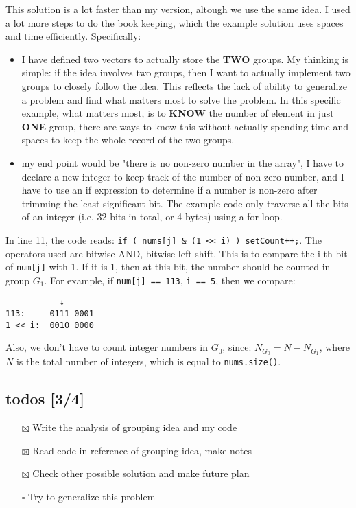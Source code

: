 \documentclass[12pt]{article}
\begin{document}
This solution is a lot faster than my version, altough we use the same idea. I used a lot more steps to do the book keeping, which the example solution uses spaces and time efficiently. Specifically:
\begin{itemize}
\item I have defined two vectors to actually store the \textbf{TWO} groups. My thinking is simple: if the idea involves two groups, then I want to actually implement two groups to closely follow the idea. This reflects the lack of ability to generalize a problem and find what matters most to solve the problem. In this specific example, what matters most, is to \textbf{KNOW} the number of element in just \textbf{ONE} group, there are ways to know this without actually spending time and spaces to keep the whole record of the two groups.
\item my end point would be "there is no non-zero number in the array", I have to declare a new integer to keep track of the number of non-zero number, and I have to use an if expression to determine if a number is non-zero after trimming the least significant bit.  The example code only traverse all the bits of an integer (i.e. 32 bits in total, or 4 bytes) using a for loop.
\end{itemize}

In line 11, the code reads: \texttt{if ( nums[j] \& (1 << i) ) setCount++;}. The operators used are bitwise AND, bitwise left shift. This is to compare the i-th bit of \texttt{num[j]} with 1. If it is 1, then at this bit, the number should be counted in group \(G_1\). For example, if \texttt{num[j] == 113}, \texttt{i == 5}, then we compare:
\begin{verbatim}
           ↓
113:     0111 0001
1 << i:  0010 0000
\end{verbatim}

Also, we don't have to count integer numbers in \(G_0\), since: \(N_{G_0} = N - N_{G_1}\), where \(N\) is the total number of integers, which is equal to \texttt{nums.size()}.

\subsection{todos [3/4]}
\label{sec:org3e83156}
\begin{itemize}
\item[{$\boxtimes$}] Write the analysis of grouping idea and my code
\item[{$\boxtimes$}] Read code in reference of grouping idea, make notes
\item[{$\boxtimes$}] Check other possible solution and make future plan
\item[{$\square$}] Try to generalize this problem
\end{itemize}
\end{document}

